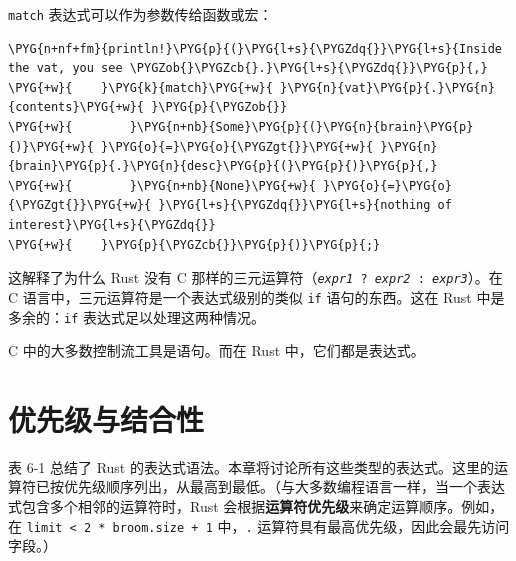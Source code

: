 \texttt{match} 表达式可以作为参数传给函数或宏：

\begin{Verbatim}[commandchars=\\\{\},breaklines=true,breakanywhere=true,fontsize=\codefont,xleftmargin=17bp]
\PYG{n+nf+fm}{println!}\PYG{p}{(}\PYG{l+s}{\PYGZdq{}}\PYG{l+s}{Inside the vat, you see \PYGZob{}\PYGZcb{}.}\PYG{l+s}{\PYGZdq{}}\PYG{p}{,}
\PYG{+w}{    }\PYG{k}{match}\PYG{+w}{ }\PYG{n}{vat}\PYG{p}{.}\PYG{n}{contents}\PYG{+w}{ }\PYG{p}{\PYGZob{}}
\PYG{+w}{        }\PYG{n+nb}{Some}\PYG{p}{(}\PYG{n}{brain}\PYG{p}{)}\PYG{+w}{ }\PYG{o}{=}\PYG{o}{\PYGZgt{}}\PYG{+w}{ }\PYG{n}{brain}\PYG{p}{.}\PYG{n}{desc}\PYG{p}{(}\PYG{p}{)}\PYG{p}{,}
\PYG{+w}{        }\PYG{n+nb}{None}\PYG{+w}{ }\PYG{o}{=}\PYG{o}{\PYGZgt{}}\PYG{+w}{ }\PYG{l+s}{\PYGZdq{}}\PYG{l+s}{nothing of interest}\PYG{l+s}{\PYGZdq{}}
\PYG{+w}{    }\PYG{p}{\PYGZcb{}}\PYG{p}{)}\PYG{p}{;}
\end{Verbatim}

这解释了为什么 Rust 没有 C 那样的三元运算符（\texttt{\emph{expr1} ? \emph{expr2} : \emph{expr3}}）。在 C 语言中，三元运算符是一个表达式级别的类似 \texttt{if} 语句的东西。这在 Rust 中是多余的：\texttt{if} 表达式足以处理这两种情况。

C 中的大多数控制流工具是语句。而在 Rust 中，它们都是表达式。

\section{优先级与结合性}

表 6-1 总结了 Rust 的表达式语法。本章将讨论所有这些类型的表达式。这里的运算符已按优先级顺序列出，从最高到最低。（与大多数编程语言一样，当一个表达式包含多个相邻的运算符时，Rust 会根据\textbf{运算符优先级}来确定运算顺序。例如，在 \texttt{limit < 2 * broom.size + 1} 中，\texttt{.} 运算符具有最高优先级，因此会最先访问字段。）


